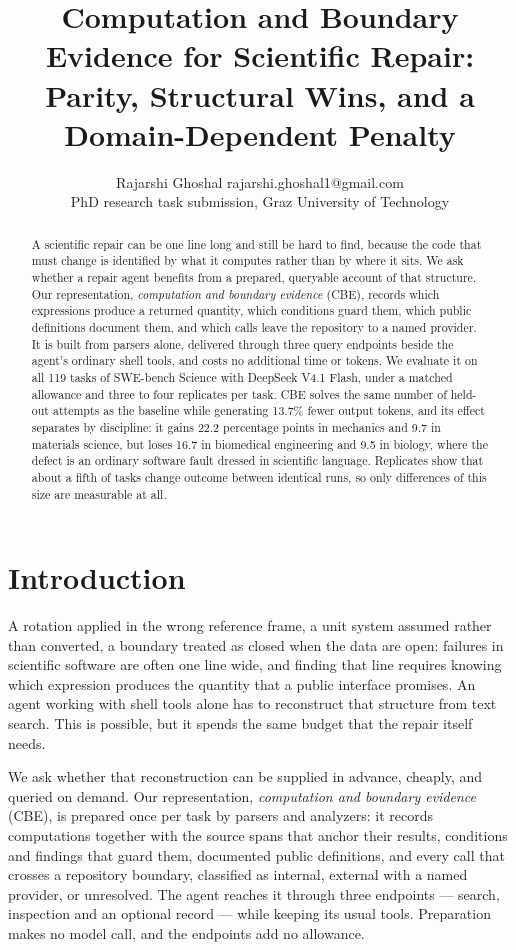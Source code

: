 \documentclass[10pt]{article}
\title{Computation and Boundary Evidence for Scientific Repair: Parity, Structural Wins, and a Domain-Dependent Penalty}
\author{\name Rajarshi Ghoshal \email rajarshi.ghoshal1@gmail.com \\
\addr PhD research task submission, Graz University of Technology}
\begin{document}
\maketitle

\begin{abstract}
\noindent
A scientific repair can be one line long and still be hard to find, because the code that must change
is identified by what it computes rather than by where it sits. We ask whether a repair agent benefits
from a prepared, queryable account of that structure. Our representation, \emph{computation and
boundary evidence} (CBE), records which expressions produce a returned quantity, which conditions
guard them, which public definitions document them, and which calls leave the repository to a named
provider. It is built from parsers alone, delivered through three query endpoints beside the agent's
ordinary shell tools, and costs no additional time or tokens. We evaluate it on all 119 tasks of
SWE-bench Science with DeepSeek V4.1 Flash, under a matched allowance and three to four replicates per
task. CBE solves the same number of held-out attempts as the baseline while generating 13.7\% fewer
output tokens, and its effect separates by discipline: it gains 22.2 percentage points in mechanics
and 9.7 in materials science, but loses 16.7 in biomedical engineering and 9.5 in biology, where the
defect is an ordinary software fault dressed in scientific language. Replicates show that about a fifth
of tasks change outcome between identical runs, so only differences of this size are measurable at all.
\end{abstract}

\section{Introduction}
A rotation applied in the wrong reference frame, a unit system assumed rather than converted, a boundary
treated as closed when the data are open: failures in scientific software are often one line wide, and
finding that line requires knowing which expression produces the quantity that a public interface
promises. An agent working with shell tools alone has to reconstruct that structure from text search.
This is possible, but it spends the same budget that the repair itself needs.

We ask whether that reconstruction can be supplied in advance, cheaply, and queried on demand. Our
representation, \emph{computation and boundary evidence} (CBE), is prepared once per task by parsers
and analyzers: it records computations together with the source spans that anchor their results,
conditions and findings that guard them, documented public definitions, and every call that crosses a
repository boundary, classified as internal, external with a named provider, or unresolved. The agent
reaches it through three endpoints --- search, inspection and an optional record --- while keeping its
usual tools. Preparation makes no model call, and the endpoints add no allowance.
\end{document}
